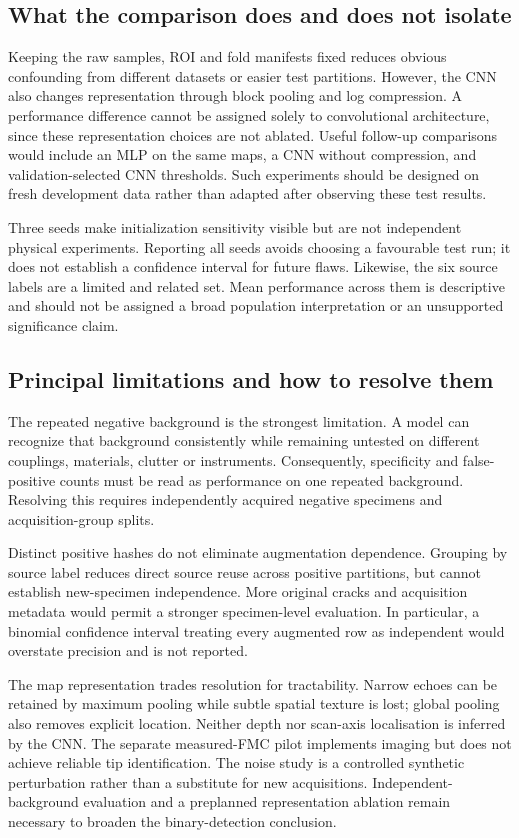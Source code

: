 \documentclass[11pt,a4paper]{article}
\begin{document}
\subsection{What the comparison does and does not isolate}

Keeping the raw samples, ROI and fold manifests fixed reduces obvious confounding from different datasets or easier test partitions. However, the CNN also changes representation through block pooling and log compression. A performance difference cannot be assigned solely to convolutional architecture, since these representation choices are not ablated. Useful follow-up comparisons would include an MLP on the same maps, a CNN without compression, and validation-selected CNN thresholds. Such experiments should be designed on fresh development data rather than adapted after observing these test results.

Three seeds make initialization sensitivity visible but are not independent physical experiments. Reporting all seeds avoids choosing a favourable test run; it does not establish a confidence interval for future flaws. Likewise, the six source labels are a limited and related set. Mean performance across them is descriptive and should not be assigned a broad population interpretation or an unsupported significance claim.

\subsection{Principal limitations and how to resolve them}

The repeated negative background is the strongest limitation. A model can recognize that background consistently while remaining untested on different couplings, materials, clutter or instruments. Consequently, specificity and false-positive counts must be read as performance on one repeated background. Resolving this requires independently acquired negative specimens and acquisition-group splits.

Distinct positive hashes do not eliminate augmentation dependence. Grouping by source label reduces direct source reuse across positive partitions, but cannot establish new-specimen independence. More original cracks and acquisition metadata would permit a stronger specimen-level evaluation. In particular, a binomial confidence interval treating every augmented row as independent would overstate precision and is not reported.

The map representation trades resolution for tractability. Narrow echoes can be retained by maximum pooling while subtle spatial texture is lost; global pooling also removes explicit location. Neither depth nor scan-axis localisation is inferred by the CNN. The separate measured-FMC pilot implements imaging but does not achieve reliable tip identification. The noise study is a controlled synthetic perturbation rather than a substitute for new acquisitions. Independent-background evaluation and a preplanned representation ablation remain necessary to broaden the binary-detection conclusion.
\end{document}
